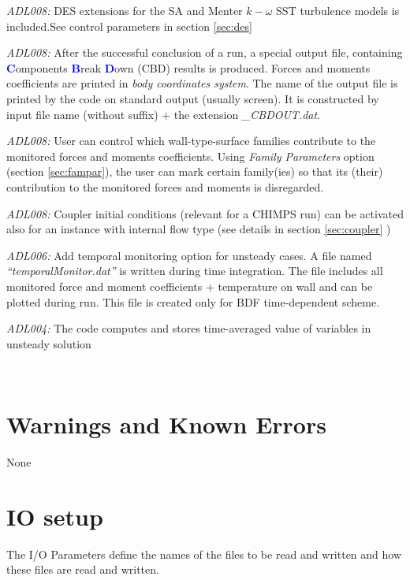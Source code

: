 \documentclass[12pt,epsf,colordvi]{article}
\begin{document}
\begin{description}
%
\item{\it ADL008:} DES extensions for the SA and Menter \(k-\omega\) SST turbulence models is included.See control parameters in section  \ref{sec:des}
%
 \item{\it ADL008:} After the successful conclusion of a run, a special output file, containing \textcolor{blue}{\bf C}omponents \textcolor{blue}{\bf B}reak \textcolor{blue}{\bf D}own (CBD) results is produced. Forces and moments coefficients are printed in {\it body coordinates system}. The name of the output file is printed by the code on standard output (usually screen). It is constructed by input file name (without suffix) + the extension {\it \_CBDOUT.dat}.
%
\item{\it ADL008:}  User can control which wall-type-surface families contribute to the monitored forces and moments coefficients. Using {\it Family Parameters} option (section \ref{sec:fampar}), the user can mark certain family(ies) so that its (their) contribution to the monitored forces and moments is disregarded. 
%
\item{\it ADL008:}  Coupler initial conditions (relevant for a CHIMPS run) can be activated also for an instance with internal flow type (see details in section \ref{sec:coupler}  )
%
 \item{\it ADL006:} Add temporal monitoring option for unsteady cases. A file named  {\it “temporalMonitor.dat”} is written during time integration. The file includes all monitored force and moment coefficients + temperature on wall and can be plotted during run. This file is created only for BDF time-dependent scheme.
%
 \item{\it ADL004:} The code computes and stores time-averaged value of variables in unsteady solution

%
\end{description}
\
%
\noindent 
\section{Warnings and Known Errors}
%
None

\noindent 
\section{IO setup}
%
The I/O Parameters define the names of the files to be read and written and how these files are read and written. 
\end{document}
